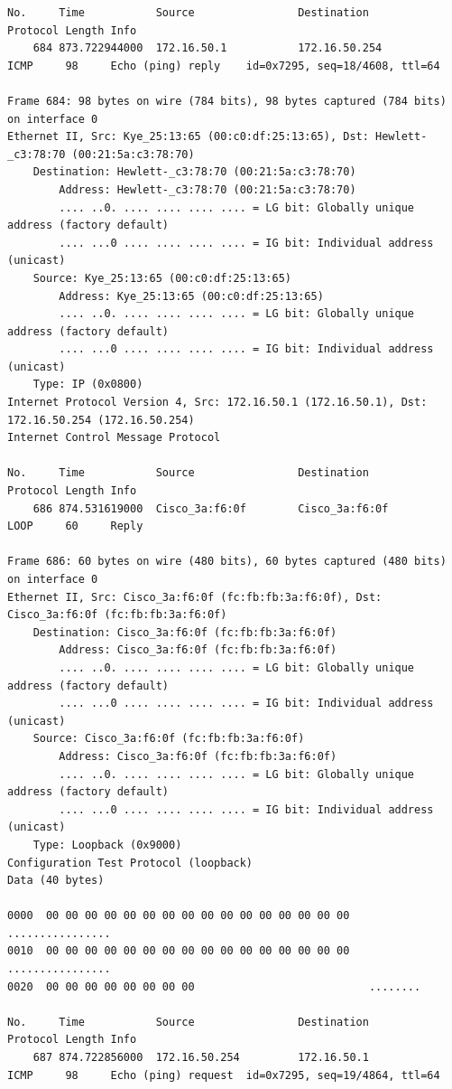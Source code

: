 \documentclass[a4paper,11pt]{article}
\begin{document}
\begin{lstlisting}
No.     Time           Source                Destination           Protocol Length Info
    684 873.722944000  172.16.50.1           172.16.50.254         ICMP     98     Echo (ping) reply    id=0x7295, seq=18/4608, ttl=64

Frame 684: 98 bytes on wire (784 bits), 98 bytes captured (784 bits) on interface 0
Ethernet II, Src: Kye_25:13:65 (00:c0:df:25:13:65), Dst: Hewlett-_c3:78:70 (00:21:5a:c3:78:70)
    Destination: Hewlett-_c3:78:70 (00:21:5a:c3:78:70)
        Address: Hewlett-_c3:78:70 (00:21:5a:c3:78:70)
        .... ..0. .... .... .... .... = LG bit: Globally unique address (factory default)
        .... ...0 .... .... .... .... = IG bit: Individual address (unicast)
    Source: Kye_25:13:65 (00:c0:df:25:13:65)
        Address: Kye_25:13:65 (00:c0:df:25:13:65)
        .... ..0. .... .... .... .... = LG bit: Globally unique address (factory default)
        .... ...0 .... .... .... .... = IG bit: Individual address (unicast)
    Type: IP (0x0800)
Internet Protocol Version 4, Src: 172.16.50.1 (172.16.50.1), Dst: 172.16.50.254 (172.16.50.254)
Internet Control Message Protocol

No.     Time           Source                Destination           Protocol Length Info
    686 874.531619000  Cisco_3a:f6:0f        Cisco_3a:f6:0f        LOOP     60     Reply

Frame 686: 60 bytes on wire (480 bits), 60 bytes captured (480 bits) on interface 0
Ethernet II, Src: Cisco_3a:f6:0f (fc:fb:fb:3a:f6:0f), Dst: Cisco_3a:f6:0f (fc:fb:fb:3a:f6:0f)
    Destination: Cisco_3a:f6:0f (fc:fb:fb:3a:f6:0f)
        Address: Cisco_3a:f6:0f (fc:fb:fb:3a:f6:0f)
        .... ..0. .... .... .... .... = LG bit: Globally unique address (factory default)
        .... ...0 .... .... .... .... = IG bit: Individual address (unicast)
    Source: Cisco_3a:f6:0f (fc:fb:fb:3a:f6:0f)
        Address: Cisco_3a:f6:0f (fc:fb:fb:3a:f6:0f)
        .... ..0. .... .... .... .... = LG bit: Globally unique address (factory default)
        .... ...0 .... .... .... .... = IG bit: Individual address (unicast)
    Type: Loopback (0x9000)
Configuration Test Protocol (loopback)
Data (40 bytes)

0000  00 00 00 00 00 00 00 00 00 00 00 00 00 00 00 00   ................
0010  00 00 00 00 00 00 00 00 00 00 00 00 00 00 00 00   ................
0020  00 00 00 00 00 00 00 00                           ........

No.     Time           Source                Destination           Protocol Length Info
    687 874.722856000  172.16.50.254         172.16.50.1           ICMP     98     Echo (ping) request  id=0x7295, seq=19/4864, ttl=64


\end{lstlisting}
\end{document}
